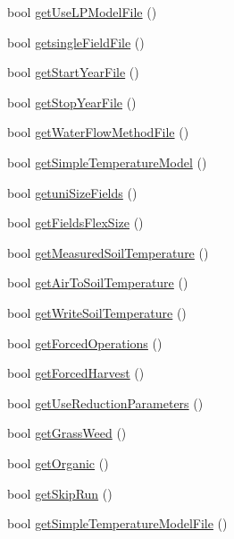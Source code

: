 \begin{DoxyCompactItemize}
\item 
bool \hyperlink{classsystem_run_data_a6d41cc4bd3f3a3c893852b6330981ced}{getUseLPModelFile} ()
\item 
bool \hyperlink{classsystem_run_data_afd31828c5d378287d6f852941fcf707f}{getsingleFieldFile} ()
\item 
bool \hyperlink{classsystem_run_data_a66c5e49283709f807a78442857ee87bc}{getStartYearFile} ()
\item 
bool \hyperlink{classsystem_run_data_a791affdd0bc38acf325dc93f76fbd638}{getStopYearFile} ()
\item 
bool \hyperlink{classsystem_run_data_a80aeb8211c05cce397080c7994980584}{getWaterFlowMethodFile} ()
\item 
bool \hyperlink{classsystem_run_data_ad56b861d83164814378f25edac3f79a2}{getSimpleTemperatureModel} ()
\item 
bool \hyperlink{classsystem_run_data_a680f978d49b871ea868f82f9e72838f9}{getuniSizeFields} ()
\item 
bool \hyperlink{classsystem_run_data_a23aacf065fc4fe618a5ea8d66a3c8748}{getFieldsFlexSize} ()
\item 
bool \hyperlink{classsystem_run_data_a10fac13758e46facee27f1f093f5d757}{getMeasuredSoilTemperature} ()
\item 
bool \hyperlink{classsystem_run_data_aa9e3f330ad95b3f7533acf86238b1ec1}{getAirToSoilTemperature} ()
\item 
bool \hyperlink{classsystem_run_data_a849d36a96c9468b781a1f7e85a78d5d1}{getWriteSoilTemperature} ()
\item 
bool \hyperlink{classsystem_run_data_adb69447b1566ee1b3e67264fb198335a}{getForcedOperations} ()
\item 
bool \hyperlink{classsystem_run_data_a0ce18b7b61179ac1d10b4da35eeb765d}{getForcedHarvest} ()
\item 
bool \hyperlink{classsystem_run_data_a1ac6d09875ece9495b031f00012d6217}{getUseReductionParameters} ()
\item 
bool \hyperlink{classsystem_run_data_a3094912706c2438c4bae4ed44d9d26fb}{getGrassWeed} ()
\item 
bool \hyperlink{classsystem_run_data_a007fac4743d2d9d5fa901215d2e4edd0}{getOrganic} ()
\item 
bool \hyperlink{classsystem_run_data_ac7af9bf7a305cfe8deccce64e1e209bd}{getSkipRun} ()
\item 
bool \hyperlink{classsystem_run_data_ad195486721667b72fd591d94ab935ae7}{getSimpleTemperatureModelFile} ()
\item 

\end{DoxyCompactItemize}
